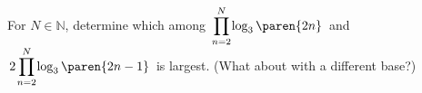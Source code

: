 For $N \in \mathbb{N}$, determine which among
$\mspace{2mu} \displaystyle{\prod\limits_{n = 2}^{N} {\mspace{-2mu} \log_{3}\paren{2 n}}} \mspace{2mu}$ and
$\mspace{2mu} \displaystyle{2 \mspace{-1mu} \prod\limits_{n = 2}^{N} {\mspace{-2mu} \log_{3}\paren{2 n - 1}}} \mspace{2mu}$
is largest. \newline
(What about with a different base?)
